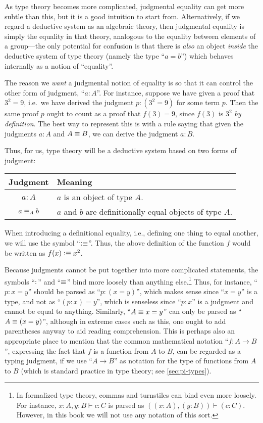As type theory becomes more complicated, judgmental equality can get more subtle than this, but it is a good intuition to start from.
Alternatively, if we regard a deductive system as an algebraic theory, then judgmental equality is simply the equality in that theory, analogous to the equality between elements of a group---the only potential for confusion is that there is \emph{also} an object \emph{inside} the deductive system of type theory (namely the type ``$a=b$'') which behaves internally as a notion of ``equality''.

The reason we \emph{want} a judgmental notion of equality is so that it can control the other form of judgment, ``$a:A$''.
For instance, suppose we have given a proof that $3^2=9$, i.e.\ we have derived the judgment $p:(3^2=9)$ for some term $p$.
Then the same proof $p$ ought to count as a proof that $f(3)=9$, since $f(3)$ is $3^2$ \emph{by definition}.
The best way to represent this is with a rule saying that given the judgments $a:A$ and $A\equiv B$, we can derive the judgment $a:B$.

Thus, for us, type theory will be a deductive system based on two forms of judgment:
\begin{center}
\begin{tabular}{c|l}
  \textbf{Judgment} & \textbf{Meaning}\\\hline
  $a : A$ & $a$ is an object of type $A$.\\
  $a \equiv_A b$ & $a$ and $b$ are definitionally equal objects of type $A$.
\end{tabular}
\end{center}
When introducing a definitional equality, i.e., defining one thing to equal another, we will use the symbol ``$\vcentcolon\equiv$''.
Thus, the above definition of the function $f$ would be written as $f(x)\vcentcolon\equiv x^2$.

Because judgments cannot be put together into more complicated statements, the symbols ``$:$'' and ``$\equiv$'' bind more loosely than anything else.\footnote{In formalized type theory, commas and turnstiles can bind even more loosely.
  For instance, $x:A,y:B\vdash c:C$ is parsed as $((x:A),(y:B))\vdash (c:C)$.
  However, in this book we will not use any notation of this sort.}
Thus, for instance, ``$p:x=y$'' should be parsed as ``$p:(x=y)$'', which makes sense since ``$x=y$'' is a type, and not as ``$(p:x)=y$'', which is senseless since ``$p:x$'' is a judgment and cannot be equal to anything.
Similarly, ``$A\equiv x=y$'' can only be parsed as ``$A\equiv(x=y)$'', although in extreme cases such as this, one ought to add parentheses anyway to aid reading comprehension.
This is perhaps also an appropriate place to mention that the common mathematical notation ``$f:A\to B$'', expressing the fact that $f$ is a function from $A$ to $B$, can be regarded as a typing judgment, if we use ``$A\to B$'' as notation for the type of functions from $A$ to $B$ (which is standard practice in type theory; see \autoref{sec:pi-types}).

